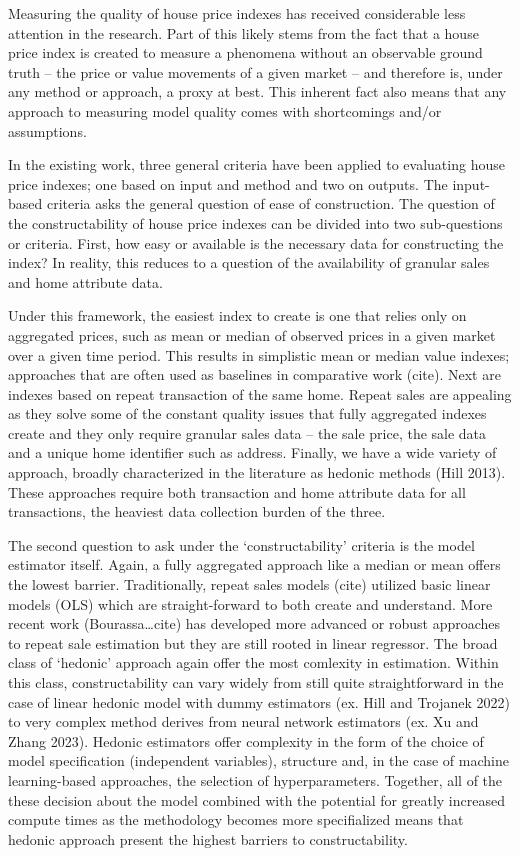 \documentclass[
]{article}
\begin{document}
Measuring the quality of house price indexes has received considerable
less attention in the research. Part of this likely stems from the fact
that a house price index is created to measure a phenomena without an
observable ground truth -- the price or value movements of a given
market -- and therefore is, under any method or approach, a proxy at
best. This inherent fact also means that any approach to measuring model
quality comes with shortcomings and/or assumptions.

In the existing work, three general criteria have been applied to
evaluating house price indexes; one based on input and method and two on
outputs. The input-based criteria asks the general question of ease of
construction. The question of the constructability of house price
indexes can be divided into two sub-questions or criteria. First, how
easy or available is the necessary data for constructing the index? In
reality, this reduces to a question of the availability of granular
sales and home attribute data.

Under this framework, the easiest index to create is one that relies
only on aggregated prices, such as mean or median of observed prices in
a given market over a given time period. This results in simplistic mean
or median value indexes; approaches that are often used as baselines in
comparative work (cite). Next are indexes based on repeat transaction of
the same home. Repeat sales are appealing as they solve some of the
constant quality issues that fully aggregated indexes create and they
only require granular sales data -- the sale price, the sale data and a
unique home identifier such as address. Finally, we have a wide variety
of approach, broadly characterized in the literature as hedonic methods
(Hill 2013). These approaches require both transaction and home
attribute data for all transactions, the heaviest data collection burden
of the three.

The second question to ask under the `constructability' criteria is the
model estimator itself. Again, a fully aggregated approach like a median
or mean offers the lowest barrier. Traditionally, repeat sales models
(cite) utilized basic linear models (OLS) which are straight-forward to
both create and understand. More recent work (Bourassa\ldots cite) has
developed more advanced or robust approaches to repeat sale estimation
but they are still rooted in linear regressor. The broad class of
`hedonic' approach again offer the most comlexity in estimation. Within
this class, constructability can vary widely from still quite
straightforward in the case of linear hedonic model with dummy
estimators (ex. Hill and Trojanek 2022) to very complex method derives
from neural network estimators (ex. Xu and Zhang 2023). Hedonic
estimators offer complexity in the form of the choice of model
specification (independent variables), structure and, in the case of
machine learning-based approaches, the selection of hyperparameters.
Together, all of the these decision about the model combined with the
potential for greatly increased compute times as the methodology becomes
more specifialized means that hedonic approach present the highest
barriers to constructability.
\end{document}
